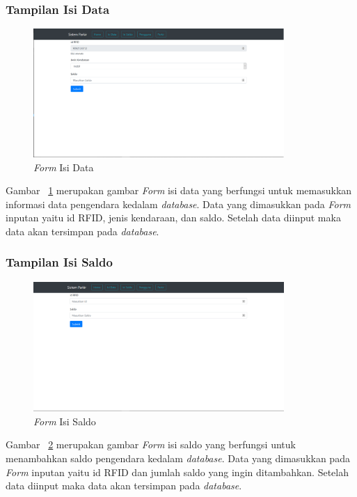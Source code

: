 \subsubsection{Tampilan Isi Data}
\begin{figure} [H]
    \includegraphics[width=0.85\textwidth, center]{images/web 2 isi data.png}
    \caption{\textit{Form} Isi Data}
    \label{fig:web2isi-data}
\end{figure}

Gambar ~\ref{fig:web2isi-data} merupakan gambar \textit{Form} isi data yang berfungsi untuk memasukkan informasi data pengendara kedalam \textit{database}. Data yang dimasukkan pada \textit{Form} inputan yaitu id RFID, jenis kendaraan, dan saldo. Setelah data diinput maka data akan tersimpan pada \textit{database}.

\subsubsection{Tampilan Isi Saldo}
\begin{figure} [H]
    \includegraphics[width=0.85\textwidth, center]{images/web 3 isi saldo.png}
    \caption{\textit{Form} Isi Saldo}
    \label{fig:web3isi-saldo}
\end{figure}

Gambar ~\ref{fig:web3isi-saldo} merupakan gambar \textit{Form} isi saldo yang berfungsi untuk menambahkan saldo pengendara kedalam \textit{database}. Data yang dimasukkan pada \textit{Form} inputan yaitu id RFID dan jumlah saldo yang ingin ditambahkan. Setelah data diinput maka data akan tersimpan pada \textit{database}.

